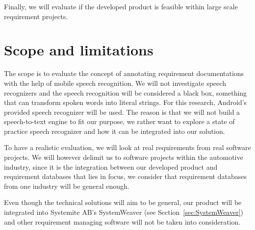 Finally, we will evaluate if the developed product is feasible within large scale requirement projects.


\section{Scope and limitations}

The scope is to evaluate the concept of annotating requirement documentations with the help of mobile speech recognition. We will not investigate speech recognizers and the speech recognition will be considered a black box, something that can transform spoken words into literal strings. For this research, Android's provided speech recognizer will be used. The reason is that we will not build a speech-to-text engine to fit our purpose, we rather want to explore a state of practice speech recognizer and how it can be integrated into our solution.

To have a realistic evaluation, we will look at real requirements from real software projects. We will however delimit us to software projects within the automotive industry, since it is the integration between our developed product and requirement databases that lies in focus, we consider that requirement databases from one industry will be general enough.

Even though the technical solutions will aim to be general, our product will be integrated into Systemite AB's SystemWeaver (see Section~\ref{sec:SystemWeaver}) and other requirement managing software will not be taken into consideration.










